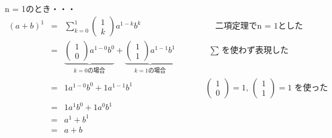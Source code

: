 \documentclass[fleqn,leqno,autodetect-engine,dvipdfmx-if-dvi,ja=standard]{bxjsarticle}
\begin{document}
\ \\
n = 1のとき・・・
\begin{eqnarray*}
 (a + b)^1 &=& \sum_{k=0}^1 \left(
                             \begin{array}{c}
                             1 \\
                             k 
	                     \end{array}
                             \right) a^{1-k} b^k \qquad \qquad \qquad \qquad \ \ \ \  \text{二項定理でn = 1とした}\\
  &=& \underbrace{ 
        \left(
        \begin{array}{c}
        1 \\
        0 
        \end{array}
        \right) a^{1-0} b^0
        }_{k = 0の場合}
        +
        \underbrace{
        \left(
        \begin{array}{c}
        1 \\
        1 
        \end{array}
        \right) a^{1-1} b^1
        }_{k = 1の場合} \qquad \qquad \text{$\sum$ を使わず表現した}\\
  &=& 1a^{1-0} b^0 + 1a^{1-1} b^1 \qquad \qquad \qquad \qquad \ \ \ \text{$\left(
                                                                    \begin{array}{c}
                                                                    1 \\
                                                                    0 
                                                                    \end{array}
                                                                    \right) = 1$,                                                                     
                                                                    $\left(
                                                                    \begin{array}{c}
                                                                    1 \\
                                                                    1 
                                                                    \end{array}
                                                                    \right) = 1$ を使った}\\
  &=& 1a^1b^0 + 1a^0b^1\\
  &=& a^1 + b^1\\
  &=& a + b
\end{eqnarray*}
\end{document}
